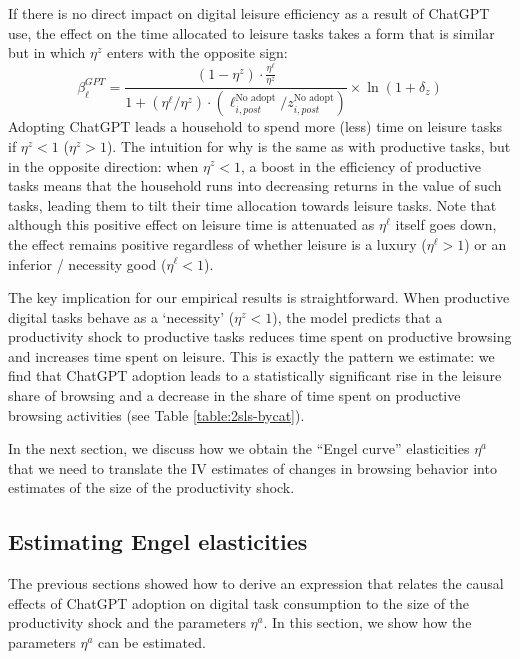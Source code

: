 \documentclass[12pt]{article}
\begin{document}
If there is no direct impact on digital leisure efficiency as a result of ChatGPT use, the effect on the time allocated to leisure tasks takes a form that is similar but in which $\eta^z$ enters with the opposite sign: 
\begin{equation}
\label{eq:stylized-model-effect-leisure}
\beta^{GPT}_{\ell}  =  \frac{(1-\eta^z) \cdot \frac{\eta^{\ell}}{\eta^z}}{1 + \left(\eta^{\ell} / \eta^z \right)\cdot \left(\ell_{i,post}^{\text{No adopt}} / z_{i,post}^{\text{No adopt}}\right)}  \times  \ln(1+ \delta_z )
\end{equation}
Adopting ChatGPT leads a household to spend more (less) time on leisure tasks if $\eta^z < 1$ ($\eta^z > 1$). The intuition for why is the same as with productive tasks, but in the opposite direction: when $\eta^z < 1$, a boost in the efficiency of productive tasks means that the household runs into decreasing returns in the value of such tasks, leading them to tilt their time allocation towards leisure tasks. Note that although this positive effect on leisure time is attenuated as $\eta^{\ell}$ itself goes down, the effect remains positive regardless of whether leisure is a luxury ($\eta^{\ell} > 1$) or an inferior  / necessity good ($\eta^{\ell} < 1$). 


The key implication for our empirical results is straightforward. When productive digital tasks behave as a `necessity' ($\eta^z < 1$), the model predicts that a productivity shock to productive tasks reduces time spent on productive browsing and increases time spent on leisure. This is exactly the pattern we estimate: we find that ChatGPT adoption leads to a statistically significant rise in the leisure share of browsing and a decrease in the share of time spent on productive browsing activities  (see Table \ref{table:2sls-bycat}).

In the next section, we discuss how we obtain the ``Engel curve'' elasticities $\eta^a$ that we need to translate the IV estimates of changes in browsing behavior into estimates of the size of the productivity shock.


\subsection{Estimating Engel elasticities} \label{sec:engelest}

The previous sections showed how to derive an expression that relates  the causal effects of ChatGPT adoption on digital task consumption to the size of the productivity shock and the parameters $\eta^a$. In this section, we show how the parameters $\eta^a$ can be estimated.
\end{document}
